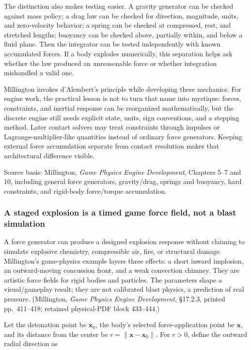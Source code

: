 The distinction also makes testing easier. A gravity generator can be checked against mass policy; a drag law can be checked for direction, magnitude, units, and zero-velocity behavior; a spring can be checked at compressed, rest, and stretched lengths; buoyancy can be checked above, partially within, and below a fluid plane. Then the integrator can be tested independently with known accumulated forces. If a body explodes numerically, this separation helps ask whether the law produced an unreasonable force or whether integration mishandled a valid one.

Millington invokes d'Alembert's principle while developing these mechanics. For engine work, the practical lesson is not to turn that name into mystique: forces, constraints, and inertial response can be reorganized mathematically, but the discrete engine still needs explicit state, units, sign conventions, and a stepping method. Later contact solvers may treat constraints through impulses or Lagrange-multiplier-like quantities instead of ordinary force generators. Keeping external force accumulation separate from contact resolution makes that architectural difference visible.

Source basis: Millington, \emph{Game Physics Engine Development}, Chapters 5--7 and 10, including general force generators, gravity/drag, springs and buoyancy, hard constraints, and rigid-body force/torque accumulation.

\subsubsection{A staged explosion is a timed game force field, not a blast simulation}\label{a-staged-explosion-is-a-timed-game-force-field-not-a-blast-simulation}

A force generator can produce a designed explosion response without claiming to simulate explosive chemistry, compressible air, fire, or structural damage. Millington's game-physics example layers three effects: a short inward implosion, an outward-moving concussion front, and a weak convection chimney. They are artistic force fields for rigid bodies and particles. The parameters shape a visual/gameplay result; they are not calibrated blast physics, a prediction of real pressure. (Millington, \emph{Game Physics Engine Development}, §17.2.3, printed pp.~411--418; retained physical-PDF block 433--444.)

Let the detonation point be \(\mathbf{x}_0\), the body's selected force-application point be \(\mathbf{x}\), and its distance from the center be \(r=\lVert\mathbf{x}-\mathbf{x}_0\rVert\). For \(r>0\), define the outward radial direction as


